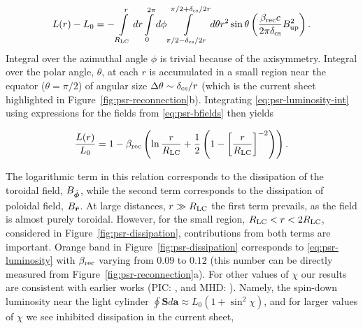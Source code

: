 \begin{equation}
\label{eq:psr-luminosity-int}
    L(r) - L_0 = -\int\limits_{R_{\rm LC}}^r dr\int\limits_0^{2\pi}d\phi \int\limits_{\pi/2-\delta_{\rm cs}/2r}^{\pi/2+\delta_{\rm cs}/2r} d\theta r^2\sin{\theta} \left(\frac{\beta_{\rm rec} c}{2\pi \delta_{\rm cs}}B_{\rm up}^2\right).
\end{equation}
\noindent Integral over the azimuthal angle $\phi$ is trivial because of the axisymmetry. Integral over the polar angle, $\theta$, at each $r$ is accumulated in a small region near the equator ($\theta=\pi/2$) of angular size $\Delta \theta\sim \delta_{\rm cs}/r$ (which is the current sheet highlighted in Figure~\ref{fig:psr-reconnection}b). Integrating \eqref{eq:psr-luminosity-int} using expressions for the fields from \eqref{eq:psr-bfields} then yields

\begin{equation}
\label{eq:psr-luminosity}
    \frac{L(r)}{L_0} = 1 - \beta_{\rm rec}\left(\ln{\frac{r}{R_{\rm LC}}}
    +\frac{1}{2}\left(1 -\left[\frac{r}{R_{\rm LC}}\right]^{-2}\right)\right).
\end{equation}

\noindent The logarithmic term in this relation corresponds to the dissipation of the toroidal field, $B_{\hat{\bm{\phi}}}$, while the second term corresponds to the dissipation of poloidal field, $B_{{\hat{\bm{r}}}}$. At large distances, $r\gg R_{\rm LC}$ the first term prevails, as the field is almost purely toroidal. However, for the small region, $R_{\rm LC}<r<2R_{\rm LC}$, considered in Figure~\ref{fig:psr-dissipation}, contributions from both terms are important. Orange band in Figure~\ref{fig:psr-dissipation} corresponds to \eqref{eq:psr-luminosity} with $\beta_{\rm rec}$ varying from $0.09$ to $0.12$ (this number can be directly measured from Figure~\ref{fig:psr-reconnection}a). For other values of $\chi$ our results are consistent with earlier works (PIC: \citealt{2015ApJ...801L..19P}, and MHD: \citealt{2013MNRAS.435L...1T}). Namely, the spin-down luminosity near the light cylinder $\oint \bm{S}d\bm{a}\approx L_0(1 + \sin^2{\chi})$, and for larger values of $\chi$ we see inhibited dissipation in the current sheet, 

